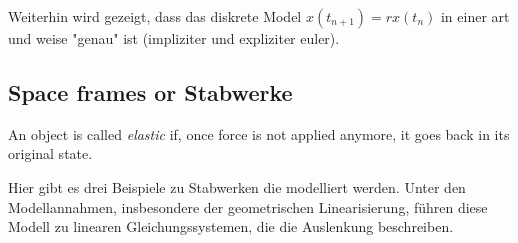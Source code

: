 Weiterhin wird gezeigt, dass das diskrete Model $x(t_{n+1}) = r x(t_n)$ in einer art und weise "genau" ist (impliziter und expliziter euler).






\subsection*{Space frames or Stabwerke}
\begin{definition}[Elastisch]\cite[p.49]{EckGarcke2017} An object is called \textit{elastic} if, once force is not applied anymore, it goes back in its original state.
\end{definition}
Hier gibt es drei Beispiele zu Stabwerken die modelliert werden. Unter den Modellannahmen, insbesondere der geometrischen Linearisierung, führen diese Modell zu linearen Gleichungssystemen, die die Auslenkung beschreiben.

